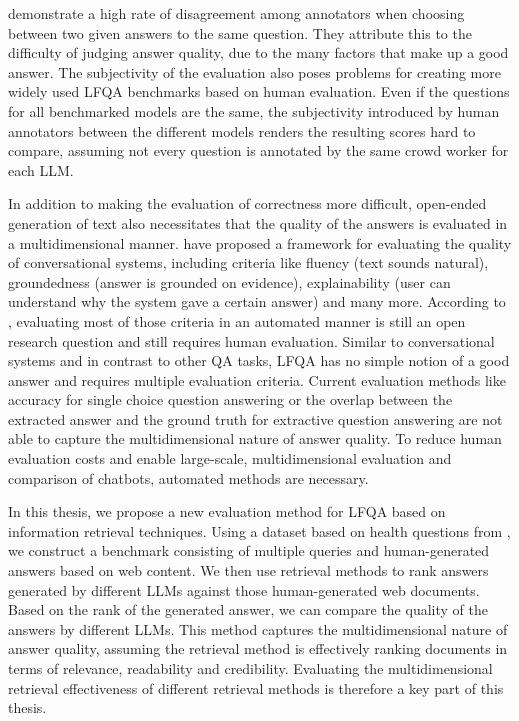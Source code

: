 \cite{krishna:2021:Hurdles} demonstrate a high rate of disagreement among annotators when choosing between two given answers to the same question.
They attribute this to the difficulty of judging answer quality, due to the many factors that make up a good answer.
The subjectivity of the evaluation also poses problems for creating more widely used LFQA benchmarks based on human evaluation.
Even if the questions for all benchmarked models are the same, the subjectivity introduced by human annotators between the different models renders the resulting scores hard to compare, assuming not every question is annotated by the same crowd worker for each LLM.

In addition to making the evaluation of correctness more difficult, open-ended generation of text also necessitates that the quality of the answers is evaluated in a multidimensional manner.
\cite{sakai:2023:swan} have proposed a framework for evaluating the quality of conversational systems, including criteria like fluency (text sounds natural), groundedness (answer is grounded on evidence), explainability (user can understand why the system gave a certain answer) and many more.
According to \cite{sakai:2023:swan}, evaluating most of those criteria in an automated manner is still an open research question and still requires human evaluation. 
Similar to conversational systems and in contrast to other QA tasks, LFQA has no simple notion of a good answer and requires multiple evaluation criteria.
Current evaluation methods like accuracy for single choice question answering or the overlap between the extracted answer and the ground truth for extractive question answering are not able to capture the multidimensional nature of answer quality.
To reduce human evaluation costs and enable large-scale, multidimensional evaluation and comparison of chatbots, automated methods are necessary.

In this thesis, we propose a new evaluation method for LFQA based on information retrieval techniques.
Using a dataset based on health questions from \cite{goeuriot:2021:Consumer}, we construct a benchmark consisting of multiple queries and human-generated answers based on web content.
We then use retrieval methods to rank answers generated by different LLMs against those human-generated web documents.
Based on the rank of the generated answer, we can compare the quality of the answers by different LLMs.
This method captures the multidimensional nature of answer quality, assuming the retrieval method is effectively ranking documents in terms of relevance, readability and credibility.
Evaluating the multidimensional retrieval effectiveness of different retrieval methods is therefore a key part of this thesis.

